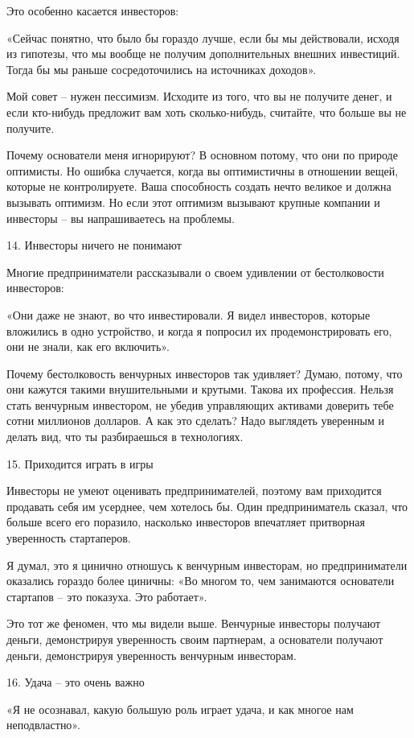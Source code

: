 \documentclass[ebook,12pt,oneside,openany]{memoir}
\begin{document}
Это особенно касается инвесторов:

«Сейчас понятно, что было бы гораздо лучше, если бы мы действовали,
исходя из гипотезы, что мы вообще не получим дополнительных внешних
инвестиций. Тогда бы мы раньше сосредоточились на источниках доходов».

Мой совет – нужен пессимизм. Исходите из того, что вы не получите
денег, и если кто-нибудь предложит вам хоть сколько-нибудь, считайте,
что больше вы не получите.

Почему основатели меня игнорируют? В основном потому, что они по
природе оптимисты. Но ошибка случается, когда вы оптимистичны в
отношении вещей, которые не контролируете. Ваша способность создать
нечто великое и должна вызывать оптимизм. Но если этот оптимизм
вызывают крупные компании и инвесторы – вы напрашиваетесь на проблемы.

14. Инвесторы ничего не понимают

Многие предприниматели рассказывали о своем удивлении от бестолковости
инвесторов:

«Они даже не знают, во что инвестировали. Я видел инвесторов, которые
вложились в одно устройство, и когда я попросил их продемонстрировать
его, они не знали, как его включить».

Почему бестолковость венчурных инвесторов так удивляет? Думаю, потому,
что они кажутся такими внушительными и крутыми. Такова их профессия.
Нельзя стать венчурным инвестором, не убедив управляющих активами
доверить тебе сотни миллионов долларов. А как это сделать? Надо
выглядеть уверенным и делать вид, что ты разбираешься в технологиях.

15. Приходится играть в игры

Инвесторы не умеют оценивать предпринимателей, поэтому вам приходится
продавать себя им усерднее, чем хотелось бы. Один предприниматель
сказал, что больше всего его поразило, насколько инвесторов впечатляет
притворная уверенность стартаперов.

Я думал, это я цинично отношусь к венчурным инвесторам, но
предприниматели оказались гораздо более циничны: «Во многом то, чем
занимаются основатели стартапов – это показуха. Это работает».

Это тот же феномен, что мы видели выше. Венчурные инвесторы получают
деньги, демонстрируя уверенность своим партнерам, а основатели
получают деньги, демонстрируя уверенность венчурным инвесторам.

16. Удача – это очень важно

«Я не осознавал, какую большую роль играет удача, и как многое нам
неподвластно».
\end{document}
